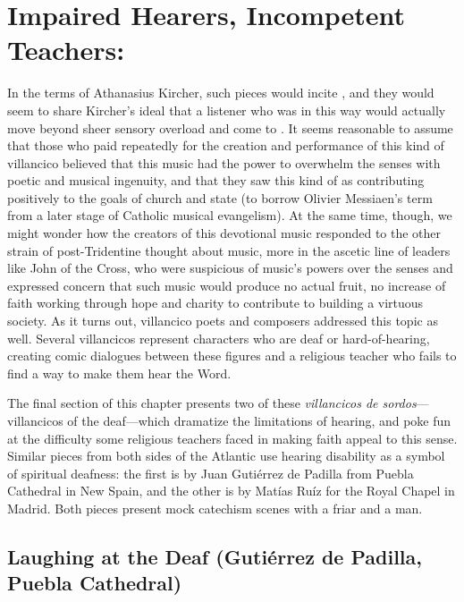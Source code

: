 \section{Impaired Hearers, Incompetent Teachers: }

In the terms of Athanasius Kircher, such pieces would incite
, and they would seem to
share Kircher's ideal that a listener who was  in this way would actually move beyond sheer sensory overload and come
to .%
    \Autocite[, ]{Kircher:Musurgia}  
It seems reasonable to assume that those who paid repeatedly for the creation
and performance of this kind of villancico believed that this music had the
power to overwhelm the senses with poetic and musical ingenuity, and that they
saw this kind of  as contributing positively to the goals of
church and state (to borrow Olivier Messiaen's term from a later stage of
Catholic musical evangelism).
At the same time, though, we might wonder how the creators of this devotional
music responded to the other strain of post-Tridentine thought about music, more
in the ascetic line of leaders like John of the Cross, who were suspicious of
music's powers over the senses and expressed concern that such music would
produce no actual fruit, no increase of faith working through hope and charity
to contribute to building a virtuous society.
As it turns out, villancico poets and composers addressed this topic as well.
Several villancicos represent characters who are deaf or hard-of-hearing,
creating comic dialogues between these figures and a religious teacher who fails
to find a way to make them hear the Word.

The final section of this chapter presents two of these \emph{villancicos de
sordos}---villancicos of the deaf---which dramatize the limitations of hearing,
and poke fun at the difficulty some religious teachers faced in making faith
appeal to this sense.
Similar pieces from both sides of the Atlantic use hearing disability as a
symbol of spiritual deafness: the first is by Juan Gutiérrez de Padilla from
Puebla Cathedral in New Spain, and the other is by Matías Ruíz for the Royal
Chapel in Madrid.
Both pieces present mock catechism scenes with a friar and a  man.


\subsection{Laughing at the Deaf (Gutiérrez de Padilla, Puebla Cathedral)}

